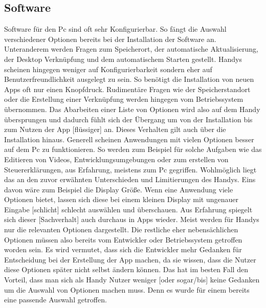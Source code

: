 \subsection{Software}\myCheckmark
Software für den Pc sind oft sehr Konfigurierbar. %
	So fängt die Auswahl verschiedener Optionen bereits bei der Installation der Software an. Unteranderem werden Fragen zum Speicherort, der automatische Aktualisierung, der Desktop Verknüpfung und dem automatischem Starten gestellt.\newline%
Handys scheinen hingegen weniger auf Konfigurierbarkeit sondern eher auf Benutzerfreundlichkeit ausgelegt zu sein. %
	So benötigt die Installation von neuen Apps oft nur einen Knopfdruck. Rudimentäre Fragen wie der Speicherstandort oder die Erstellung einer Verknüpfung werden hingegen vom Betriebssystem übernommen. Das Abarbeiten einer Liste von Optionen wird also auf dem Handy übersprungen und dadurch fühlt sich der Übergang um von der Installation bis zum Nutzen der App [flüssiger] an.\newline%
Dieses Verhalten gilt auch über die Installation hinaus. Generell scheinen Anwendungen mit vielen Optionen besser auf dem Pc zu funktionieren. %
	So werden zum Beispiel für solche Aufgaben wie das Editieren von Videos, Entwicklungsumgebungen oder zum erstellen von Steuererklärungen, aus Erfahrung, meistens zum Pc gegriffen. %
		Wohlmöglich liegt das an den zuvor erwähnten Unterschieden und Limitierungen des Handys. Eins davon wäre zum Beispiel die Display Größe. Wenn eine Anwendung viele Optionen bietet, lassen sich diese bei einem kleinen Display mit ungenauer Eingabe [schlicht] schlecht auswählen und überschauen.\newline%
Aus Erfahrung spiegelt sich dieser [Sachverhalt] auch durchaus in Apps wieder. Meist werden für Handys nur die relevanten Optionen dargestellt. Die restliche eher nebensächlichen Optionen müssen also bereits vom Entwickler oder Betriebssystem getroffen worden sein.\newline%
	Es wird vermutet, dass sich die Entwickler mehr Gedanken für Entscheidung bei der Erstellung der App machen, da sie wissen, dass die Nutzer diese Optionen später nicht selbst ändern können.\newline%
	Das hat im besten Fall den Vorteil, dass man sich als Handy Nutzer weniger [oder sogar/bis] keine Gedanken um die Auswahl von Optionen machen muss. Denn es wurde für einem bereits eine passende Auswahl getroffen.%








